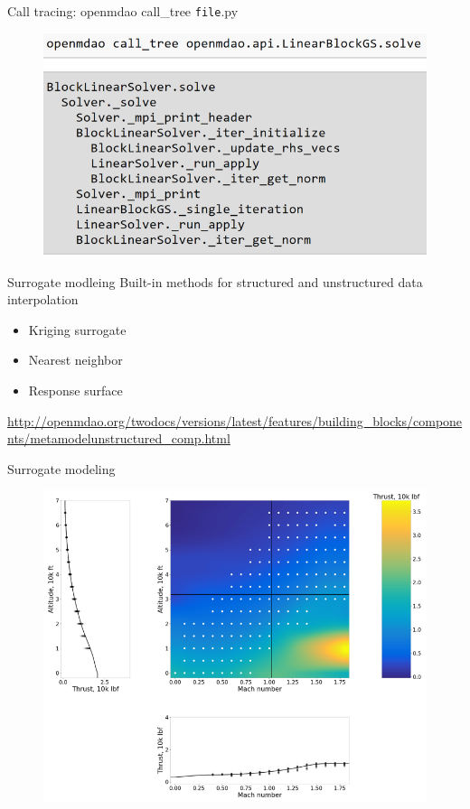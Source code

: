 \documentclass[aspectratio=169, usenames,dvipsnames, 14pt]{beamer}
\begin{document}
\begin{frame}{Call tracing: openmdao call\_tree \texttt{file}.py}
	\begin{figure}
		\includegraphics[scale=.6]{images/slide_129.png}
	\end{figure}
\end{frame}

\begin{frame}{Surrogate modleing}
	Built-in methods for structured and unstructured data interpolation
	\begin{itemize}
		\item Kriging surrogate
		\item Nearest neighbor
		\item Response surface
	\end{itemize}
	
	\url{http://openmdao.org/twodocs/versions/latest/features/building_blocks/components/metamodelunstructured_comp.html}

\end{frame}

\begin{frame}{Surrogate modeling}
	\begin{figure}
		\includegraphics[scale=.39]{images/slide_131.png}
	\end{figure}
\end{frame}
\end{document}

